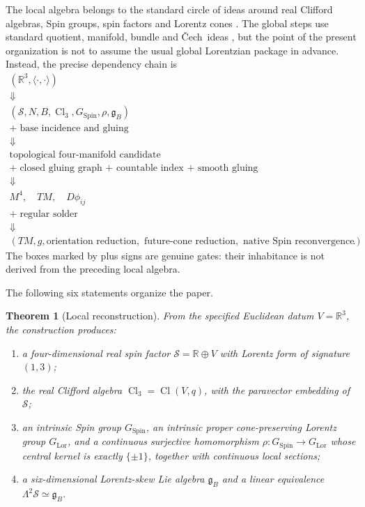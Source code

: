 \documentclass[11pt,a4paper]{article}
\newtheorem{theorem}{Theorem}[section]
\theoremstyle{definition}
\theoremstyle{remark}
\newcommand{\R}{\mathbb{R}}
\newcommand{\Smodel}{\mathcal{S}}
\newcommand{\Cl}{\operatorname{Cl}}
\newcommand{\SpinG}{G_{\mathrm{Spin}}}
\newcommand{\LorG}{G_{\mathrm{Lor}}}
\newcommand{\Cech}{\ifmmode\text{\v{C}ech}\else\v{C}ech\fi}
\newcommand{\gB}{\mathfrak{g}_{B}}
\begin{document}
The local algebra belongs to the standard circle of ideas around real
Clifford algebras, Spin groups, spin factors and Lorentz cones
\cite{Chevalley,LawsonMichelsohn,JordanNeumannWigner,FarautKoranyi}.
The global steps use standard quotient, manifold, bundle and \Cech\ ideas
\cite{LeeSmooth,Husemoller,Steenrod,KobayashiNomizu}, but the point of the
present organization is not to assume the usual global Lorentzian package
in advance.  Instead, the precise dependency chain is
\[
\boxed{
\begin{array}{c}
(\R^{3},\langle\cdot,\cdot\rangle)
\\[0.25em]\Downarrow\\[-0.15em]
(\Smodel,N,B,\Cl_{3},\SpinG,\rho,\gB)
\\[0.25em]
+\;\text{base incidence and gluing}
\\[-0.05em]\Downarrow\\[-0.15em]
\text{topological four-manifold candidate}
\\[0.25em]
+\;\text{closed gluing graph + countable index + smooth gluing}
\\[-0.05em]\Downarrow\\[-0.15em]
M^{4},\quad TM,\quad D\phi_{ij}
\\[0.25em]
+\;\text{regular solder}
\\[-0.05em]\Downarrow\\[-0.15em]
(TM,g,\text{orientation reduction},
\text{ future-cone reduction},
\text{ native Spin reconvergence}).
\end{array}}
\tag{1.1}
\]
The boxes marked by plus signs are genuine gates: their inhabitance is not
derived from the preceding local algebra.

The following six statements organize the paper.

\begin{theorem}[Local reconstruction]
\label{thm:intro-local}
From the specified Euclidean datum \(V=\R^{3}\), the construction produces:
\begin{enumerate}
\item a four-dimensional real spin factor
      \(\Smodel=\R\oplus V\) with Lorentz form of signature \((1,3)\);
\item the real Clifford algebra \(\Cl_{3}=\Cl(V,q)\), with the paravector
      embedding of \(\Smodel\);
\item an intrinsic Spin group \(\SpinG\), an intrinsic proper
      cone-preserving Lorentz group \(\LorG\), and a continuous surjective
      homomorphism \(\rho:\SpinG\to\LorG\) whose central kernel is exactly
      \(\{\pm1\}\), together with continuous local sections;
\item a six-dimensional Lorentz-skew Lie algebra \(\gB\) and a linear
      equivalence \(\Lambda^{2}\Smodel\simeq\gB\).
\end{enumerate}
\end{theorem}
\end{document}
